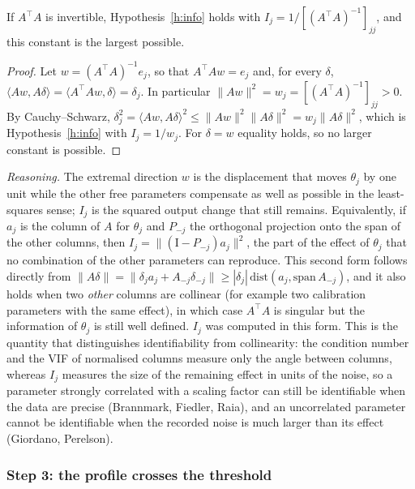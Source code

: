 \begin{slemma}\label{l:info}
If $A^{\top}A$ is invertible, Hypothesis~\ref{h:info} holds with $I_j=1/[(A^{\top}A)^{-1}]_{jj}$, and this constant is the largest possible.
\end{slemma}
\begin{proof}
Let $w=(A^{\top}A)^{-1}e_j$, so that $A^{\top}Aw=e_j$ and, for every $\delta$, $\langle Aw,A\delta\rangle=\langle A^{\top}Aw,\delta\rangle=\delta_j$. In particular $\|Aw\|^2=w_j=[(A^{\top}A)^{-1}]_{jj}>0$. By Cauchy--Schwarz, $\delta_j^2=\langle Aw,A\delta\rangle^2\le\|Aw\|^2\|A\delta\|^2=w_j\|A\delta\|^2$, which is Hypothesis~\ref{h:info} with $I_j=1/w_j$. For $\delta=w$ equality holds, so no larger constant is possible.
\end{proof}
\emph{Reasoning.} The extremal direction $w$ is the displacement that moves $\theta_j$ by one unit while the other free parameters compensate as well as possible in the least-squares sense; $I_j$ is the squared output change that still remains. Equivalently, if $a_j$ is the column of $A$ for $\theta_j$ and $P_{-j}$ the orthogonal projection onto the span of the other columns, then $I_j=\|(\mathrm{I}-P_{-j})a_j\|^2$, the part of the effect of $\theta_j$ that no combination of the other parameters can reproduce. This second form follows directly from $\|A\delta\|=\|\delta_ja_j+A_{-j}\delta_{-j}\|\ge|\delta_j|\,\mathrm{dist}(a_j,\mathrm{span}\,A_{-j})$, and it also holds when two \emph{other} columns are collinear (for example two calibration parameters with the same effect), in which case $A^{\top}A$ is singular but the information of $\theta_j$ is still well defined. $I_j$ was computed in this form. This is the quantity that distinguishes identifiability from collinearity: the condition number and the VIF of normalised columns measure only the angle between columns, whereas $I_j$ measures the size of the remaining effect in units of the noise, so a parameter strongly correlated with a scaling factor can still be identifiable when the data are precise (Brannmark, Fiedler, Raia), and an uncorrelated parameter cannot be identifiable when the recorded noise is much larger than its effect (Giordano, Perelson).

\subsubsection*{Step 3: the profile crosses the threshold}

